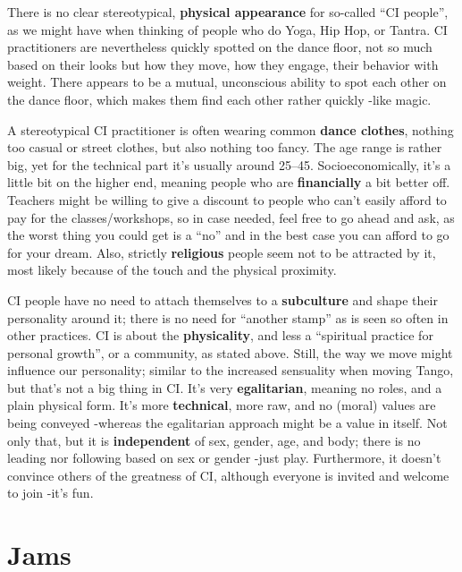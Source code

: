There is no clear stereotypical, \textbf{physical appearance} for so-called ``CI people'', as we might have when thinking of people who do Yoga, Hip Hop, or Tantra.
CI practitioners are nevertheless quickly spotted on the dance floor, not so much based on their looks but how they move, how they engage, their behavior with weight.
There appears to be a mutual, unconscious ability to spot each other on the dance floor, which makes them find each other rather quickly -like magic.

A stereotypical CI practitioner is often wearing common \textbf{dance clothes}, nothing too casual or street clothes, but also nothing too fancy.
The age range is rather big, yet for the technical part it's usually around 25--45.
Socioeconomically, it's a little bit on the higher end, meaning people who are \textbf{financially} a bit better off.
Teachers might be willing to give a discount to people who can't easily afford to pay for the classes/workshops, so in case needed, feel free to go ahead and ask, as the worst thing you could get is a ``no'' and in the best case you can afford to go for your dream.
Also, strictly \textbf{religious} people seem not to be attracted by it, most likely because of the touch and the physical proximity.

CI people have no need to attach themselves to a \textbf{subculture} and shape their personality around it; there is no need for ``another stamp'' as is seen so often in other practices.
CI is about the \textbf{physicality}, and less a ``spiritual practice for personal growth'', or a community, as stated above.
Still, the way we move might influence our personality; similar to the increased sensuality when moving Tango, but that's not a big thing in CI\@.
It's very \textbf{egalitarian}, meaning no roles, and a plain physical form.
It's more \textbf{technical}, more raw, and no (moral) values are being conveyed -whereas the egalitarian approach might be a value in itself.
Not only that, but it is \textbf{independent} of sex, gender, age, and body; there is no leading nor following based on sex or gender -just play.
Furthermore, it doesn't convince others of the greatness of CI, although everyone is invited and welcome to join -it's fun.

\section{Jams}\label{sec:jams}

